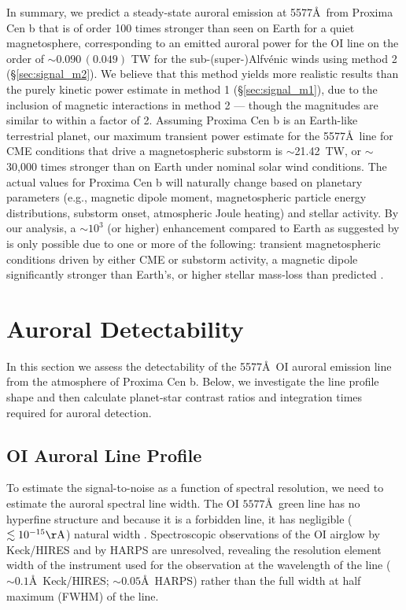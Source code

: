 \documentclass{emulateapj}
\begin{document}
In summary, we predict a steady-state auroral emission at 5577\AA\ from Proxima Cen b that is of order 100 times stronger than seen on Earth for a quiet magnetosphere, corresponding to an emitted auroral power for the OI line on the order of ${\sim} 0.090\, (0.049)$ TW for the sub-\mbox{(super-)}Alfv\'{e}nic winds using method 2 (\S\ref{sec:signal_m2}). We believe that this method yields more realistic results than the purely kinetic power estimate in method 1 (\S\ref{sec:signal_m1}), due to the inclusion of magnetic interactions in method 2 --- though the magnitudes are similar to within a factor of 2. Assuming Proxima Cen b is an Earth-like terrestrial planet, our maximum transient power estimate for the 5577\AA\ line for CME conditions that drive a magnetospheric substorm is $\sim$21.42~TW, or ${\sim}$30,000 times stronger than on Earth under nominal solar wind conditions. The actual values for Proxima Cen b will naturally change based on planetary parameters (e.g., magnetic dipole moment, magnetospheric particle energy distributions, substorm onset, atmospheric Joule heating) and stellar activity. By our analysis, a ${\sim} 10^3$ (or higher) enhancement compared to Earth as suggested by \citet{OMalley2016} is only possible due to one or more of the following: transient magnetospheric conditions driven by either CME or substorm activity, a magnetic dipole significantly stronger than Earth's, or higher stellar mass-loss than predicted \citep{Wood2005,Cohen2014}.
 
\section{Auroral Detectability}
\label{sec:detect}

In this section we assess the detectability of the 5577\AA\ OI auroral emission line from the atmosphere of Proxima Cen b. Below, we investigate the line profile shape and then calculate planet-star contrast ratios and integration times required for auroral detection.

\subsection{OI Auroral Line Profile}
\label{sec:line_profile}

To estimate the signal-to-noise as a function of spectral resolution, we need to estimate the auroral spectral line width.  The OI $5577$\AA\ green line has no hyperfine structure and because it is a forbidden line, it has negligible ($\lesssim 10^{-15}\mathrm{\AA}$) natural width \citep{Hunten1967}.
Spectroscopic observations of the OI airglow by Keck/HIRES \citep{Slanger2001} and by HARPS \citep[][see \S\ref{sec:search}]{Anglada-Escude2016} are unresolved, revealing the resolution element width of the instrument used for the observation at the wavelength of the line (${\sim}0.1$\AA\ Keck/HIRES; ${\sim}0.05$\AA\ HARPS) rather than the full width at half maximum (FWHM) of the line.
\end{document}
